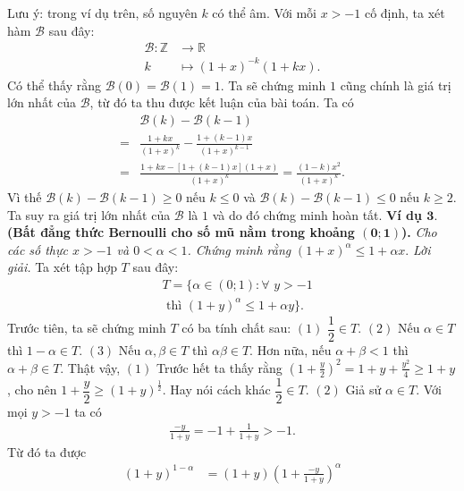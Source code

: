 \begin{multicols}{2}
		\vskip 0.1cm
		 Lưu ý: trong ví dụ trên, số nguyên $k$ có thể âm.
		\vskip 0.1cm
		Với mỗi $x>-1$ cố định, ta xét hàm $\mathscr{B}$  sau đây:
		\begin{align*}
			\mathscr{B}: \mathbb{Z} & \rightarrow \mathbb{R} \\
			k&  \mapsto (1+x)^{-k}(1+k x).
		\end{align*}
		Có thể thấy rằng  $\mathscr{B}(0)= \mathscr{B}(1)=1$. 
		Ta sẽ chứng minh $1$ cũng chính là giá trị lớn nhất của $\mathscr{B}$, từ đó ta thu được kết luận của bài toán. Ta có
		\begin{align*}
			&\mathscr{B}(k)-\mathscr{B}(k-1) \\
			=&\frac{1+k x}{(1+x)^{k}}-\frac{1+(k-1) x}{(1+x)^{k-1}} \\
			=&\frac{1\!+\!k x\!-\![1\!+\!(k\!-\!1) x](1\!+\!x)}{(1\!+\!x)^{k}}=\frac{(1-k) x^{2}}{(1+x)^{k}}.
		\end{align*}
		Vì thế $\mathscr{B}(k)-\mathscr{B}(k-1) \ge 0$ nếu $k\le 0$ và $\mathscr{B}(k)-\mathscr{B}(k-1) \le 0$ nếu $k\ge 2$.
		Ta suy ra giá trị lớn nhất của
		$\mathscr{B}$ là $1$ và do đó chứng minh hoàn tất.
		\vskip 0.1cm
		\textbf{\color{hoccungpi}Ví dụ $\pmb{3.}$ (Bất đẳng thức Bernoulli cho số mũ nằm trong khoảng $\pmb{(0;1)}$).}
		\textit{Cho các số thực $x>-1$ và $0<\alpha <1$. Chứng minh rằng}
			$(1+x)^{\alpha} \le 1+ \alpha x.$
		\vskip 0.1cm
		\textit{Lời giải.} Ta xét tập hợp $T$ sau đây:
		\begin{align*}
			&T=\{\alpha \in (0;1): \forall \,\,y>-1 \\
			&\textrm{ thì } (1+y)^{\alpha} \le 1+ \alpha y\}.
		\end{align*}
		Trước tiên, ta sẽ chứng minh $T$ có ba tính chất sau:
		\vskip 0.1cm
		$(1)$ $\dfrac{1}{2} \in T$.
		\vskip 0.1cm
		$(2)$ Nếu $\alpha \in T$ thì $1-\alpha \in T$.
		\vskip 0.1cm
		$(3)$ Nếu $\alpha, \beta \in T$ thì $\alpha \beta \in T$. Hơn nữa, nếu $\alpha + \beta<1$ thì $\alpha + \beta\in T$.
		\vskip 0.1cm
		Thật vậy,
		\vskip 0.1cm 
		$(1)$ Trước hết ta thấy rằng $\left(1+\frac{y}{2}\right)^{2}=1+y+\frac{y^{2}}{4} \geq 1+y $, cho nên $1+\dfrac{y}{2} \geq  (1+y)^{\frac{1}{2}}$. Hay nói cách khác $\dfrac{1}{2} \in T$.
		\vskip 0.1cm 
		$(2)$ Giả sử $\alpha \in T$. Với mọi $y>-1$ ta có
		\begin{align*}
			\frac{-y}{1+y}=-1+\frac{1}{1+y}>-1.
		\end{align*}
		Từ đó ta được
		\begin{align*}
			(1+y)^{1-\alpha}&=(1+y)\left(1+\frac{-y}{1+y}\right)^{\alpha} \\

\end{align*}
\end{multicols}
